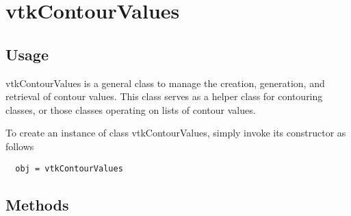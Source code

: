 \section{vtkContourValues}

\subsection{Usage}

 vtkContourValues is a general class to manage the creation, generation,
 and retrieval of contour values. This class serves as a helper class for
 contouring classes, or those classes operating on lists of contour values.

To create an instance of class vtkContourValues, simply
invoke its constructor as follows
\begin{verbatim}
  obj = vtkContourValues
\end{verbatim}
\subsection{Methods}

